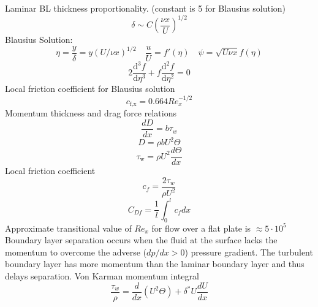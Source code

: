 \documentclass{article}
\begin{document}
Laminar BL thickness proportionality. (constant is 5 for Blausius solution)
\begin{equation}
  \delta \sim C\left(\frac{\nu x}{U}\right)^{1/2}
\end{equation}
\newline
\newline
Blausius Solution:
\begin{equation}
  \eta=\frac{y}{\delta}=y(U/\nu x)^{1/2}\quad\frac{u}{U}=f'(\eta)\quad\psi = \sqrt{U\nu x}f(\eta)
\end{equation}
\begin{equation}
  2 \frac{\text{d}^3 f}{\text{d} \eta^3} + f \frac{\text{d}^2 f}{\text{d} \eta^2} = 0
\end{equation}
Local friction coefficient for Blausius solution
\begin{equation}
  c_\text{f,x} = 0.664 Re_x^{-1/2}
\end{equation}
\newline
\newline
Momentum thickness and drag force relations
\begin{equation}
  \frac{dD}{dx} = b \tau_w
\end{equation}
\begin{equation}
  D = \rho b U^2 \Theta
\end{equation}
\begin{equation}
  \tau_\text{w} = \rho U^2 \frac{d \Theta}{d x}
\end{equation}
\newline
\newline
Local friction coefficient
\begin{equation}
  c_f = \frac{2\tau_w}{\rho U^2}
\end{equation}
\begin{equation}
  C_{Df} = \frac{1}{l}\int_0^l c_f dx
\end{equation}
\newline
\newline
Approximate transitional value of $Re_x$ for flow over a flat plate is $\approx 5 \cdot 10^5$
Boundary layer separation occurs when the fluid at the surface lacks the momentum to overcome the adverse ($dp/dx > 0$) pressure gradient. The turbulent boundary layer has more momentum than the laminar boundary layer and thus delays separation.
\newline
\newline
Von Karman momentum integral
\begin{equation}
  \frac{\tau_w}{\rho} =  \frac{d}{dx}(U^2\Theta) + \delta^* U\frac{dU}{dx}
\end{equation}
\end{document}
